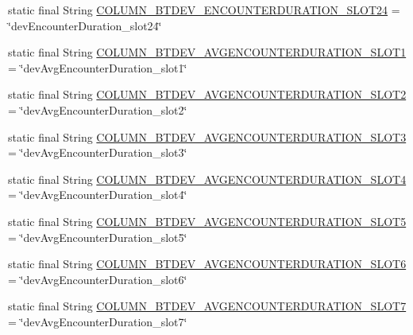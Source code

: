 \begin{DoxyCompactItemize}
\item 
static final String \hyperlink{classcs_1_1nsense_1_1db_1_1_n_sense_s_q_lite_helper_a42c8ca8db6aa3f3d7b59f188a4387d9c}{C\-O\-L\-U\-M\-N\-\_\-\-B\-T\-D\-E\-V\-\_\-\-E\-N\-C\-O\-U\-N\-T\-E\-R\-D\-U\-R\-A\-T\-I\-O\-N\-\_\-\-S\-L\-O\-T24} = \char`\"{}dev\-Encounter\-Duration\-\_\-slot24\char`\"{}
\item 
static final String \hyperlink{classcs_1_1nsense_1_1db_1_1_n_sense_s_q_lite_helper_a01abb8709f16bb28bf7779efee94ac3a}{C\-O\-L\-U\-M\-N\-\_\-\-B\-T\-D\-E\-V\-\_\-\-A\-V\-G\-E\-N\-C\-O\-U\-N\-T\-E\-R\-D\-U\-R\-A\-T\-I\-O\-N\-\_\-\-S\-L\-O\-T1} = \char`\"{}dev\-Avg\-Encounter\-Duration\-\_\-slot1\char`\"{}
\item 
static final String \hyperlink{classcs_1_1nsense_1_1db_1_1_n_sense_s_q_lite_helper_a14a25d28cd5b4e703d0cd168fa139afe}{C\-O\-L\-U\-M\-N\-\_\-\-B\-T\-D\-E\-V\-\_\-\-A\-V\-G\-E\-N\-C\-O\-U\-N\-T\-E\-R\-D\-U\-R\-A\-T\-I\-O\-N\-\_\-\-S\-L\-O\-T2} = \char`\"{}dev\-Avg\-Encounter\-Duration\-\_\-slot2\char`\"{}
\item 
static final String \hyperlink{classcs_1_1nsense_1_1db_1_1_n_sense_s_q_lite_helper_a56b3605c7035238a393c85fcd728b6f4}{C\-O\-L\-U\-M\-N\-\_\-\-B\-T\-D\-E\-V\-\_\-\-A\-V\-G\-E\-N\-C\-O\-U\-N\-T\-E\-R\-D\-U\-R\-A\-T\-I\-O\-N\-\_\-\-S\-L\-O\-T3} = \char`\"{}dev\-Avg\-Encounter\-Duration\-\_\-slot3\char`\"{}
\item 
static final String \hyperlink{classcs_1_1nsense_1_1db_1_1_n_sense_s_q_lite_helper_a32daef921c1403dad6e392b7e6175807}{C\-O\-L\-U\-M\-N\-\_\-\-B\-T\-D\-E\-V\-\_\-\-A\-V\-G\-E\-N\-C\-O\-U\-N\-T\-E\-R\-D\-U\-R\-A\-T\-I\-O\-N\-\_\-\-S\-L\-O\-T4} = \char`\"{}dev\-Avg\-Encounter\-Duration\-\_\-slot4\char`\"{}
\item 
static final String \hyperlink{classcs_1_1nsense_1_1db_1_1_n_sense_s_q_lite_helper_a1c7b3ac072abf5067e215710ff923d3a}{C\-O\-L\-U\-M\-N\-\_\-\-B\-T\-D\-E\-V\-\_\-\-A\-V\-G\-E\-N\-C\-O\-U\-N\-T\-E\-R\-D\-U\-R\-A\-T\-I\-O\-N\-\_\-\-S\-L\-O\-T5} = \char`\"{}dev\-Avg\-Encounter\-Duration\-\_\-slot5\char`\"{}
\item 
static final String \hyperlink{classcs_1_1nsense_1_1db_1_1_n_sense_s_q_lite_helper_af08de2fe7b75c324ff9b5d3c713ba4d9}{C\-O\-L\-U\-M\-N\-\_\-\-B\-T\-D\-E\-V\-\_\-\-A\-V\-G\-E\-N\-C\-O\-U\-N\-T\-E\-R\-D\-U\-R\-A\-T\-I\-O\-N\-\_\-\-S\-L\-O\-T6} = \char`\"{}dev\-Avg\-Encounter\-Duration\-\_\-slot6\char`\"{}
\item 
static final String \hyperlink{classcs_1_1nsense_1_1db_1_1_n_sense_s_q_lite_helper_a888f87fe7e2d20149ea4a75c83665e13}{C\-O\-L\-U\-M\-N\-\_\-\-B\-T\-D\-E\-V\-\_\-\-A\-V\-G\-E\-N\-C\-O\-U\-N\-T\-E\-R\-D\-U\-R\-A\-T\-I\-O\-N\-\_\-\-S\-L\-O\-T7} = \char`\"{}dev\-Avg\-Encounter\-Duration\-\_\-slot7\char`\"{}

\end{DoxyCompactItemize}
